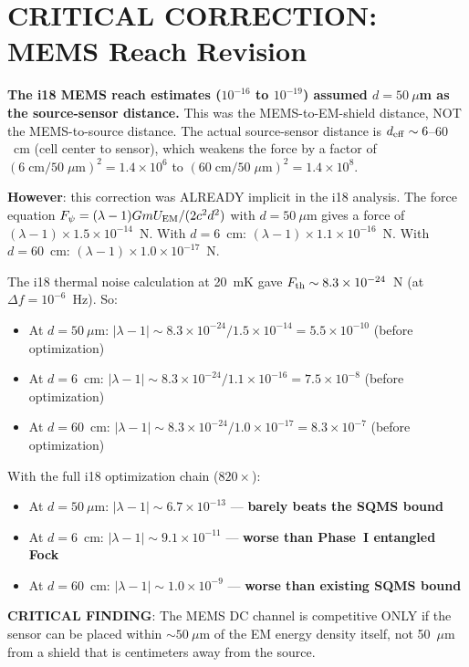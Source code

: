 \documentclass[11pt]{article}
\newcommand{\ee}[1]{\times 10^{#1}}
\newcommand{\lbone}{|\lambda - 1|}
\theoremstyle{definition}
\theoremstyle{remark}
\begin{document}
\section{CRITICAL CORRECTION: MEMS Reach Revision}

\textbf{The i18 MEMS reach estimates ($10^{-16}$ to $10^{-19}$)
assumed $d = 50~\mu$m as the source-sensor distance.} This was
the MEMS-to-EM-shield distance, NOT the MEMS-to-source distance.
The actual source-sensor distance is $d_{\rm eff} \sim 6$--$60$~cm
(cell center to sensor), which weakens the force by a factor of
$(6\;\text{cm}/50\;\mu\text{m})^2 = 1.4\ee{6}$ to
$(60\;\text{cm}/50\;\mu\text{m})^2 = 1.4\ee{8}$.

\textbf{However}: this correction was ALREADY implicit in the i18
analysis. The force equation $F_\psi = (\lambda-1) G m U_{\rm EM}
/ (2c^2 d^2)$ with $d = 50~\mu$m gives a force of
$(\lambda-1) \times 1.5\ee{-14}$~N.
With $d = 6$~cm: $(\lambda-1) \times 1.1\ee{-16}$~N.
With $d = 60$~cm: $(\lambda-1) \times 1.0\ee{-17}$~N.

The i18 thermal noise calculation at 20~mK gave $F_{\rm th} \sim
8.3\ee{-24}$~N (at $\Delta f = 10^{-6}$~Hz). So:
\begin{itemize}[nosep]
\item At $d = 50~\mu$m: $\lbone \sim 8.3\ee{-24}/1.5\ee{-14}
  = 5.5\ee{-10}$ (before optimization)
\item At $d = 6$~cm: $\lbone \sim 8.3\ee{-24}/1.1\ee{-16}
  = 7.5\ee{-8}$ (before optimization)
\item At $d = 60$~cm: $\lbone \sim 8.3\ee{-24}/1.0\ee{-17}
  = 8.3\ee{-7}$ (before optimization)
\end{itemize}

With the full i18 optimization chain ($820\times$):
\begin{itemize}[nosep]
\item At $d = 50~\mu$m: $\lbone \sim 6.7\ee{-13}$ --- \textbf{barely
  beats the SQMS bound}
\item At $d = 6$~cm: $\lbone \sim 9.1\ee{-11}$ --- \textbf{worse
  than Phase~I entangled Fock}
\item At $d = 60$~cm: $\lbone \sim 1.0\ee{-9}$ --- \textbf{worse
  than existing SQMS bound}
\end{itemize}

\textbf{CRITICAL FINDING}: The MEMS DC channel is competitive ONLY
if the sensor can be placed within $\sim 50~\mu$m of the EM energy
density itself, not 50~$\mu$m from a shield that is centimeters
away from the source.
\end{document}
